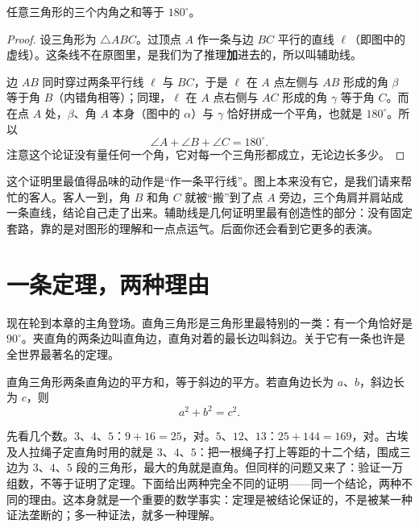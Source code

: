 \begin{dingli}[三角形内角和]
任意三角形的三个内角之和等于 $180^\circ$。
\end{dingli}

\begin{center}
\end{center}

\begin{proof}
设三角形为 $\triangle ABC$。过顶点 $A$ 作一条与边 $BC$ 平行的直线 $\ell$（即图中的虚线）。这条线不在原图里，是我们为了推理\textbf{加}进去的，所以叫辅助线。

边 $AB$ 同时穿过两条平行线 $\ell$ 与 $BC$，于是 $\ell$ 在 $A$ 点左侧与 $AB$ 形成的角 $\beta$ 等于角 $B$（内错角相等）；同理，$\ell$ 在 $A$ 点右侧与 $AC$ 形成的角 $\gamma$ 等于角 $C$。而在点 $A$ 处，$\beta$、角 $A$ 本身（图中的 $\alpha$）与 $\gamma$ 恰好拼成一个平角，也就是 $180^\circ$。所以
\[
\angle A+\angle B+\angle C=180^\circ.
\]
注意这个论证没有量任何一个角，它对每一个三角形都成立，无论边长多少。
\end{proof}

这个证明里最值得品味的动作是“作一条平行线”。图上本来没有它，是我们请来帮忙的客人。客人一到，角 $B$ 和角 $C$ 就被“搬”到了点 $A$ 旁边，三个角肩并肩站成一条直线，结论自己走了出来。辅助线是几何证明里最有创造性的部分：没有固定套路，靠的是对图形的理解和一点点运气。后面你还会看到它更多的表演。

\section{一条定理，两种理由}

现在轮到本章的主角登场。直角三角形是三角形里最特别的一类：有一个角恰好是 $90^\circ$。夹直角的两条边叫直角边，直角对着的最长边叫斜边。关于它有一条也许是全世界最著名的定理。

\begin{dingli}[勾股定理]
直角三角形两条直角边的平方和，等于斜边的平方。若直角边长为 $a$、$b$，斜边长为 $c$，则
\[
a^2+b^2=c^2.
\]
\end{dingli}

先看几个数。$3$、$4$、$5$：$9+16=25$，对。$5$、$12$、$13$：$25+144=169$，对。古埃及人拉绳子定直角时用的就是 $3$、$4$、$5$：把一根绳子打上等距的十二个结，围成三边为 $3$、$4$、$5$ 段的三角形，最大的角就是直角。但同样的问题又来了：验证一万组数，不等于证明了定理。下面给出两种完全不同的证明——同一个结论，两种不同的理由。这本身就是一个重要的数学事实：定理是被结论保证的，不是被某一种证法垄断的；多一种证法，就多一种理解。


